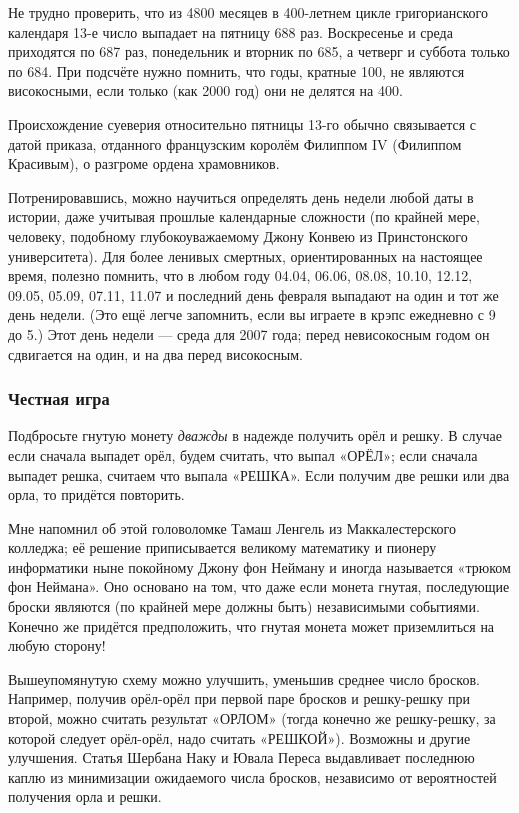 Не трудно проверить, что из 4800 месяцев в 400-летнем цикле григорианского календаря 13-е число выпадает на пятницу 688 раз.
Воскресенье и среда приходятся по 687 раз, понедельник и вторник по 685, а четверг и суббота только по 684.
При подсчёте нужно помнить, что годы, кратные 100, не являются високосными, если только (как 2000 год) они не делятся на 400.

Происхождение суеверия относительно пятницы 13-го обычно связывается с датой приказа, отданного французским королём Филиппом IV (Филиппом Красивым), о разгроме ордена храмовников.

Потренировавшись, можно научиться определять день недели любой даты в истории, даже учитывая прошлые календарные сложности
(по крайней мере, человеку, подобному глубокоуважаемому Джону Конвею из Принстонского университета).
Для более ленивых смертных, ориентированных на настоящее время, полезно помнить, что в любом году
04.04, 06.06, 08.08, 10.10, 12.12, 09.05, 05.09, 07.11, 11.07 и последний день февраля выпадают на один и тот же день недели.
(Это ещё легче запомнить, если вы играете в крэпс ежедневно с 9 до 5.)
Этот день недели --- среда для 2007 года;
перед невисокосным годом он сдвигается на один, и на два перед високосным.

\subsubsection*{Честная игра}

Подбросьте гнутую монету \emph{дважды} в надежде получить орёл и решку.
В случае если сначала выпадет орёл, будем считать, что выпал «ОРЁЛ»;
если сначала выпадет решка, считаем что выпала «РЕШКА».
Если получим две решки или два орла, то придётся повторить.

Мне напомнил об этой головоломке Тамаш Ленгель из Маккалестерского колледжа;
её решение приписывается великому математику и пионеру информатики ныне покойному Джону фон Нейману и иногда называется «трюком фон Неймана».
Оно основано на том, что даже если монета гнутая, последующие броски являются (по крайней мере должны быть) независимыми событиями.
Конечно же придётся предположить, что гнутая монета может приземлиться на любую сторону!

Вышеупомянутую схему можно улучшить, уменьшив среднее число бросков.
Например, получив орёл-орёл при первой паре бросков и решку-решку при второй, можно считать результат «ОРЛОМ» (тогда конечно же решку-решку, за которой следует орёл-орёл, надо считать «РЕШКОЙ»).
Возможны и другие улучшения.
Статья Шербана Наку и Ювала Переса \cite{44} выдавливает последнюю каплю из минимизации ожидаемого числа бросков, независимо от вероятностей получения орла и решки.

